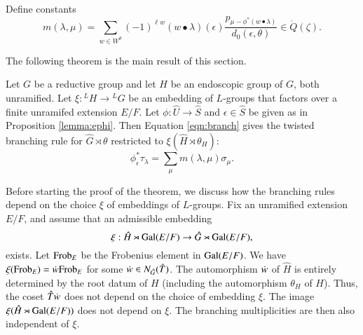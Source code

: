 



Define constants 
\begin{equation}\label{eqn:branch}
m(\lambda,\mu) = \sum_{w\in W^\theta} 
(-1)^{\ell w} ({w\bullet\lambda})(\epsilon)
\frac{p_{\mu-\phi^*(w\bullet\lambda)}}{d_0(\epsilon,\theta)} \in \ring{Q}(\zeta).
\end{equation}

The following theorem is the main result of this section.

\begin{theorem}\label{thm:branch}
  Let $G$ be a reductive group and let $H$ be an endoscopic group of
  $G$, both unramified.  Let $\xi:{}^LH\to {}^LG$ be an embedding of
  $L$-groups that factors over a finite unramifed extension $E/F$.
  Let $\phi:\hat U\to \hat S$ and $\epsilon\in\hat S$ be given as in
  Proposition \ref{lemma:ephi}.  Then Equation \ref{eqn:branch} gives
  the twisted branching rule for $\hat G\rtimes \theta$ restricted to
  $\xi(\hat H\rtimes \theta_H)$:
\[
\phi^*_\epsilon\tau_\lambda = \sum_\mu m(\lambda,\mu) \sigma_\mu.
\]
\end{theorem}

Before starting the proof of the theorem, we discuss how the branching
rules depend on the choice $\xi$ of embeddings of $L$-groups.  Fix an
unramified extension $E/F$, and assume that an admissible embedding
\[
\xi:\hat H \rtimes {\operatorname{Gal}}(E/F)\to \hat G \rtimes {\operatorname{Gal}}(E/F),
\]
exists.  Let ${\operatorname{Frob}}_{E}$ be the Frobenius element in
${\operatorname{Gal}}(E/F)$.  We have $\xi({\operatorname{Frob}}_{E}) = \dot w {\operatorname{Frob}}_E$ for
some $\dot w \in N_{\hat G}(\hat T)$.  The automorphism $\dot w $ of
$\hat H$ is entirely determined by the root datum of $H$ (including
the automorphism $\theta_H$ of $H$).  Thus, the coset $\hat T \dot w $
does not depend on the choice of embedding $\xi$.  The image $\xi(\hat
H\rtimes {\operatorname{Gal}}(E/F))$ does not depend on $\xi$.  The branching
multiplicities are then also independent of $\xi$.

